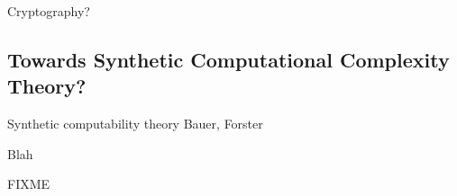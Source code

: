 \documentclass[acmsmall,review,screen,anonymous]{acmart}
\begin{document}
Cryptography?

\subsection{Towards Synthetic Computational Complexity Theory?}

Synthetic computability theory Bauer, Forster

Blah



\begin{acks}
  FIXME
\end{acks}



\end{document}
